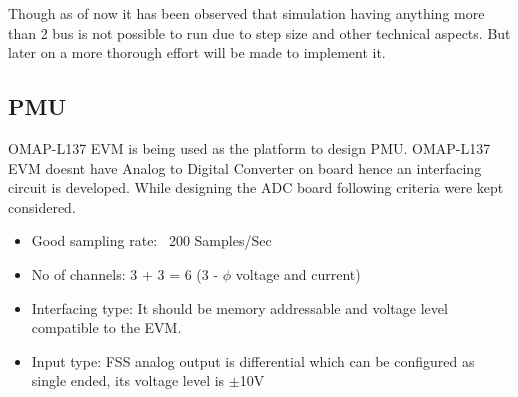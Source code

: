 Though as of now it has been observed that simulation having anything more than 2 bus is not possible to run due to step size and other technical aspects. But later on a more thorough effort will be made to implement it.

\subsection{PMU}
OMAP-L137 EVM is being used as the platform to design PMU. OMAP-L137 EVM doesnt have Analog to Digital Converter on board hence an interfacing circuit is developed. While designing the ADC board following criteria were kept considered.
\begin{itemize}
\item Good sampling rate: ~200 Samples/Sec
\item No of channels: 3 + 3 = 6 (3 - $\phi$ voltage and current) 
\item Interfacing type: It should be memory addressable and voltage level compatible  to the EVM.
\item Input type: FSS analog output is differential which can be configured as single ended, its voltage level is $\pm$10V
\end{itemize}

